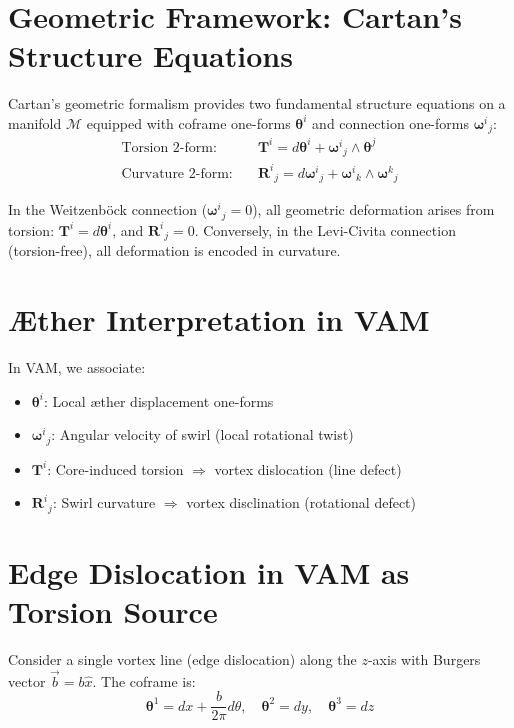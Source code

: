 \section{Geometric Framework: Cartan's Structure Equations}\label{sec:framework}

Cartan's geometric formalism provides two fundamental structure equations on a manifold $\mathcal{M}$ equipped with coframe one-forms $\boldsymbol{\theta}^i$ and connection one-forms $\boldsymbol{\omega}^i{}_j$:
\begin{align}
    \text{Torsion 2-form:}\quad & \mathbf{T}^i = d\boldsymbol{\theta}^i + \boldsymbol{\omega}^i{}_j \wedge \boldsymbol{\theta}^j \\
    \text{Curvature 2-form:}\quad & \mathbf{R}^i{}_j = d\boldsymbol{\omega}^i{}_j + \boldsymbol{\omega}^i{}_k \wedge \boldsymbol{\omega}^k{}_j
\end{align}

In the Weitzenböck connection ($\boldsymbol{\omega}^i{}_j = 0$), all geometric deformation arises from torsion: $\mathbf{T}^i = d\boldsymbol{\theta}^i$, and $\mathbf{R}^i{}_j = 0$. Conversely, in the Levi-Civita connection (torsion-free), all deformation is encoded in curvature.

\section{Æther Interpretation in VAM}

In VAM, we associate:
\begin{itemize}
    \item $\boldsymbol{\theta}^i$: Local \ae ther displacement one-forms
    \item $\boldsymbol{\omega}^i{}_j$: Angular velocity of swirl (local rotational twist)
    \item $\mathbf{T}^i$: Core-induced torsion $\Rightarrow$ vortex dislocation (line defect)
    \item $\mathbf{R}^i{}_j$: Swirl curvature $\Rightarrow$ vortex disclination (rotational defect)
\end{itemize}

\section{Edge Dislocation in VAM as Torsion Source}

Consider a single vortex line (edge dislocation) along the $z$-axis with Burgers vector $\vec{b} = b\hat{x}$. The coframe is:
\begin{equation}
    \boldsymbol{\theta}^1 = dx + \frac{b}{2\pi} d\theta, \quad \boldsymbol{\theta}^2 = dy, \quad \boldsymbol{\theta}^3 = dz
\end{equation}

